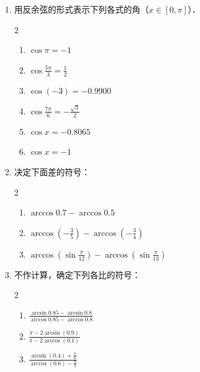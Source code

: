 \begin{enumerate}
    \item 用反余弦的形式表示下列各式的角（$x\in[0,\pi]$）．
\begin{multicols}{2}
\begin{enumerate}
    \item $\cos\pi =-1$
    \item $\cos\frac{5\pi}{3}=\frac{1}{2}$
    \item $\cos(-3)=-0.9900$
    \item $\cos\frac{7\pi}{6}=-\frac{\sqrt{3}}{2}$
    \item $\cos x=-0.8065$
    \item $\cos x=-1$
\end{enumerate}
\end{multicols}

\item 决定下面差的符号：
\begin{multicols}{2}
\begin{enumerate}
 \item $\arccos0.7-\arccos0.5$
\item $\arccos\left(-\frac{3}{5}\right)-\arccos\left(-\frac{3}{4}\right)$
\item $\arccos\left(\sin\frac{\pi}{12}\right)-\arccos\left(\sin\frac{\pi}{13}\right)$
\end{enumerate}
\end{multicols}
\item 不作计算，确定下列各比的符号：
\begin{multicols}{2}
\begin{enumerate}
    \item $\frac{\arcsin0.85-\arcsin0.8}{\arccos0.85-\arccos0.8}$
    \item $\frac{\pi -2\arcsin(0.9)}{\pi -2\arccos(0.1)}$
    \item $\frac{\arcsin(0.4)+\frac{\pi}{6}}{\arccos(0.6)-\frac{\pi}{3}}$
\end{enumerate}
\end{multicols}


\end{enumerate}
